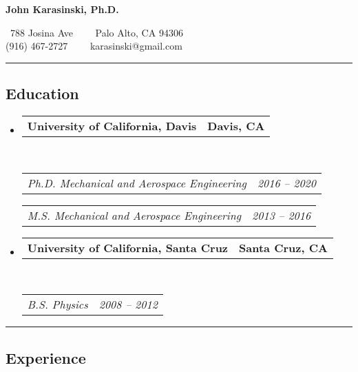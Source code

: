 \documentclass[10pt,letterpaper]{article}
\makeatletter
\newcommand{\headerrow}[2]
{\begin{tabular*}{\linewidth}{l@{\extracolsep{\fill}}r}
	#1 &
	#2 \\
\end{tabular*}}
\makeatother
\begin{document}
\begin{center}
	{\LARGE \textbf{John Karasinski, Ph.D.}}

	\ 788 Josina Ave\ \ \textbullet
	\ \ Palo Alto, CA 94306
	\\
	\hspace{1.2em} (916) 467-2727\ \ \textbullet
	\ \ karasinski@gmail.com
\end{center}

\hrule
\vspace{-0.4em}
\subsection*{Education}

\begin{itemize}
	\parskip=0.1em

	\item
	      \headerrow
	      {\textbf{University of California, Davis}}
	      {\textbf{Davis, CA}}
	      \\
	      \headerrow
	      {\emph{Ph.D. Mechanical and Aerospace Engineering}}
	      {\emph{2016 -- 2020}}

	      \headerrow
	      {\emph{M.S. Mechanical and Aerospace Engineering}}
	      {\emph{2013 -- 2016}}

	\item
	      \headerrow
	      {\textbf{University of California, Santa Cruz}}
	      {\textbf{Santa Cruz, CA}}
	      \\
	      \headerrow
	      {\emph{B.S. Physics}}
	      {\emph{2008 -- 2012}}
\end{itemize}

\hrule
\vspace{-0.4em}
\subsection*{Experience}
\end{document}
